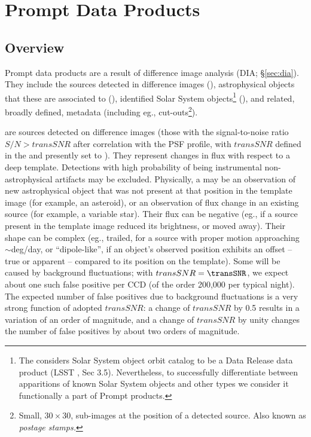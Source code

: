 \documentclass[SE,lsstdraft,toc]{lsstdoc}
\begin{document}
\clearpage

\section{Prompt Data Products}
\label{sec:level1}

\subsection{Overview}

Prompt data products are a result of difference image analysis (DIA; \S \ref{sec:dia}). They include the sources detected in difference images (\DIASources), astrophysical objects that these are associated to (\DIAObjects), identified Solar System objects\footnote{The \SRD considers Solar System object orbit catalog to be a Data Release data product (LSST \SRD, Sec 3.5). Nevertheless, to successfully differentiate between apparitions of known Solar System objects and other types \DIASources we consider it functionally a part of Prompt products.} (\SSObject), and related, broadly defined, metadata (including eg., cut-outs\footnote{Small, $30 \times 30$, sub-images at the position of a detected source. Also known as \emph{postage stamps.}}).

\DIASources are sources detected on difference images (those with the signal-to-noise ratio $S/N>transSNR$ after correlation with the PSF profile, with $transSNR$ defined in the \SRD and presently set to \transSNR). They represent changes in flux with respect to a deep template. Detections with high probability of being instrumental non-astrophysical artifacts may be excluded. Physically, a \DIASource may be an observation of new astrophysical object that was not present at that position in the template image (for example, an asteroid), or an observation of flux change in an existing source (for example, a variable star). Their flux can be negative (eg., if a source present in the template image reduced its brightness, or moved away). Their shape can be complex (eg., trailed, for a source with proper motion approaching $\sim$deg/day, or ``dipole-like'', if an object's observed position exhibits an offset -- true or apparent -- compared to its position on the template).
Some \DIASources will be caused by background fluctuations; with $transSNR = \transSNR$,
we expect about one such false positive per CCD (of the order 200,000 per typical night). The expected number of false
positives due to background fluctuations is a very strong function of adopted $transSNR$: a change of $transSNR$ by 0.5
results in a variation of an order of magnitude, and a change of $transSNR$ by unity changes the number of false
positives by about two orders of magnitude.
\end{document}
